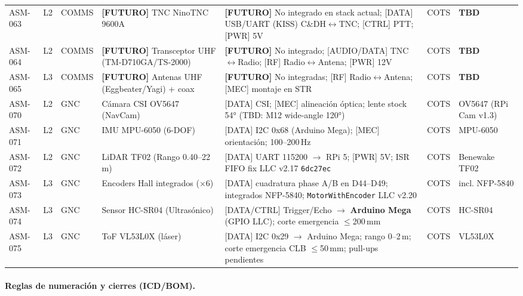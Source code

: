 \begin{table}[H]
{\begin{tabular}{p{1.8cm} p{1.2cm} p{1.6cm} p{4.5cm} p{5.0cm} p{1.3cm} p{2.5cm}}
ASM-063 & L2 & COMMS & \textbf{[FUTURO]} TNC NinoTNC 9600A & \textbf{[FUTURO]} No integrado en stack actual; [DATA] USB/UART (KISS) C\&DH$\leftrightarrow$TNC; [CTRL] PTT; [PWR] 5V & COTS & \textbf{TBD} \\
ASM-064 & L2 & COMMS & \textbf{[FUTURO]} Transceptor UHF (TM-D710GA/TS-2000) & \textbf{[FUTURO]} No integrado; [AUDIO/DATA] TNC$\leftrightarrow$Radio; [RF] Radio$\leftrightarrow$Antena; [PWR] 12V & COTS & \textbf{TBD} \\
ASM-065 & L3 & COMMS & \textbf{[FUTURO]} Antenas UHF (Eggbeater/Yagi) + coax & \textbf{[FUTURO]} No integradas; [RF] Radio$\leftrightarrow$Antena; [MEC] montaje en STR & COTS & \textbf{TBD} \\

ASM-070 & L2 & GNC & Cámara CSI OV5647 (NavCam) & [DATA] CSI; [MEC] alineación óptica; lente stock 54° (TBD: M12 wide-angle 120°) & COTS & OV5647 (RPi Cam v1.3) \\
ASM-071 & L2 & GNC & IMU MPU-6050 (6-DOF) & [DATA] I2C 0x68 (Arduino Mega); [MEC] orientación; 100--200\,Hz & COTS & MPU-6050 \\
ASM-072 & L2 & GNC & LiDAR TF02 (Rango 0.40--22\,m) & [DATA] UART 115200 $\rightarrow$ RPi 5; [PWR] 5V; ISR FIFO fix LLC v2.17 \texttt{6dc27ec} & COTS & Benewake TF02 \\
ASM-073 & L3 & GNC & Encoders Hall integrados ($\times$6) & [DATA] cuadratura phase A/B en D44--D49; integrados NFP-5840; \texttt{MotorWithEncoder} LLC v2.20 & COTS & incl. NFP-5840 \\
ASM-074 & L3 & GNC & Sensor HC-SR04 (Ultrasónico) & [DATA/CTRL] Trigger/Echo $\rightarrow$ \textbf{Arduino Mega} (GPIO LLC); corte emergencia $\le$200\,mm & COTS & HC-SR04 \\
ASM-075 & L3 & GNC & ToF VL53L0X (láser) & [DATA] I2C 0x29 $\rightarrow$ Arduino Mega; rango 0--2\,m; corte emergencia CLB $\le$50\,mm; pull-ups pendientes & COTS & VL53L0X \\
\hline
\end{tabular}}
\end{table}

\paragraph{Reglas de numeración y cierres (ICD/BOM).}
\label{subsec:asm_rules}


